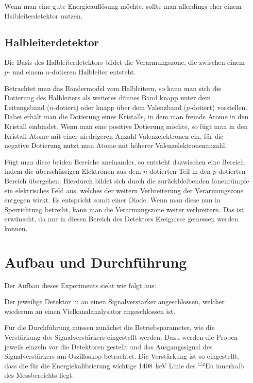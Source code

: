 \documentclass[11pt, ngerman, fleqn, DIV=15, headinclude, BCOR=2cm]{scrreprt}
\begin{document}
Wenn man eine gute Energieauflösung möchte, sollte man allerdings eher einem
Halbleiterdetektor nutzen.

\section{Halbleiterdetektor}
Die Basis des Halbleiterdetektors bildet die Verarmungszone, die zwischen einem
$p$- und einem $n$-dotieren Halbleiter entsteht.

Betrachtet man das Bändermodel vom Halbleitern, so kann man sich die Dotierung
des Halbleiters als weiteres dünnes Band knapp unter dem Leitungsband
($n$-dotiert) oder knapp über dem Valenzband ($p$-dotiert) vorstellen.
Dabei erhält man die Dotierung eines Kristalls, in dem man fremde Atome in den
Kristall einbindet.
Wenn man eine positive Dotierung möchte, so fügt man in den Kristall Atome mit
einer niedrigeren Anzahl Valenzelektronen ein, für die negative Dotierung nutzt
man Atome mit höherer Valenzelektronenanzahl.

Fügt man diese beiden Bereiche aneinander, so entsteht dazwischen eine Bereich,
indem die überschüssigen Elektronen aus dem $n$-dotierten Teil in den
$p$-dotierten Bereich übergehen.
Hierdurch bildet sich durch die zurückbleibenden Ionenrümpfe ein elektrisches Feld aus, welches
der weitern Verbreiterung der Verarmungszone entgegen wirkt.
Es entspricht somit einer Diode.
Wenn man diese nun in Sperrichtung betreibt, kann man die Verarmungszone weiter
verbreitern.
Das ist erwünscht, da nur in diesen Bereich des Detektors Ereignisse
gemessen werden können.

\chapter{Aufbau und Durchführung}

Der Aufbau dieses Experiments sieht wie folgt aus:

Der jeweilige Detektor in an einen Signalverstärker angeschlossen, welcher
wiederum an einen Vielkanalanalysator angeschlossen ist.

Für die Durchführung müssen zunächst die Betriebsparameter, wie die
Verstärkung des Signalverstärkers eingestellt werden.
Dazu werden die Proben jeweils einzeln vor die Detektoren gestellt und das
Ausgangssignal des Signalverstärkers am Oszilloskop betrachtet.
Die Verstärkung ist so eingestellt, dass die für die Energiekalibrierung
wichtige \SI{1408}{\kilo\electronvolt} Linie des $^{152}\text{Eu}$
innerhalb des Messbereichts liegt.
\end{document}
